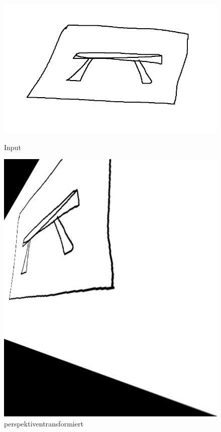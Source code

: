 \begin{figure}[H]
    \centering
    \begin{minipage}[t]{0.45\linewidth}
        \centering
        \includegraphics[width=\linewidth]{pics/bildverarbeitungsalgos/ApproxPolyDP_input.png}
        \caption{Input}
        \label{maai:wrapperspective:input}
    \end{minipage}
    \hfill
    \begin{minipage}[t]{0.45\linewidth}
        \centering
        \includegraphics[width=\linewidth]{pics/bildverarbeitungsalgos/wrapperspective.png}
        \caption{perspektiventransformiert}
        \label{maai:wrapperspective:output}
    \end{minipage}
\end{figure}

